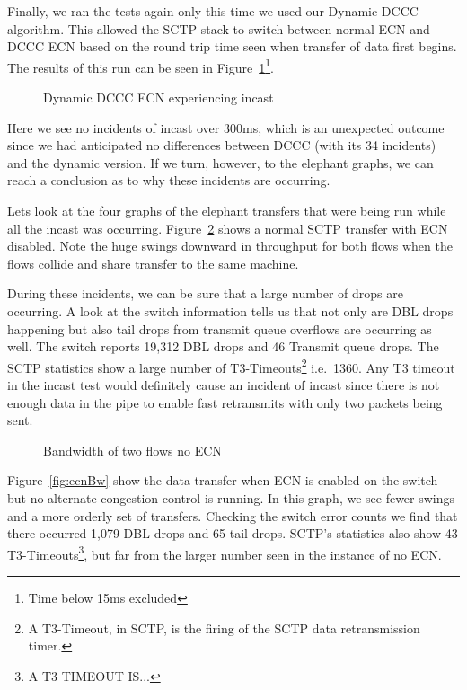 \documentclass[12pt]{article}
\begin{document}
\newpage

Finally, we ran the tests again only this time we used our Dynamic DCCC algorithm. This allowed the
SCTP stack to switch between normal ECN and DCCC ECN based on the round trip time
seen when transfer of data first begins. The results of this run can be seen in Figure~\ref{fig:dynIncast}\footnote{Time below 15ms excluded}.


\begin{figure}[h]
\centering
{}
\caption{Dynamic DCCC ECN experiencing incast}
\label{fig:dynIncast}
\end{figure}

Here we see no incidents of incast over 300ms, which is an unexpected
outcome since we had anticipated no differences between DCCC (with its 34 incidents) and
the dynamic version. If we turn, however, to the elephant graphs, we can reach a conclusion
as to why these incidents are occurring.

\newpage

Lets look at the four graphs of the elephant transfers that were being run while all
the incast was occurring. Figure~\ref{fig:noEcnBw} shows a normal SCTP transfer with
ECN disabled. Note the huge swings downward in throughput for both
flows when the flows collide and share transfer to the same machine. 

During these incidents, we can be sure that a large number of drops are occurring. A look at the switch
information tells us that not only are DBL drops happening but also tail
drops from transmit queue overflows are occurring as well.  The switch reports 19,312 DBL drops
and 46 Transmit queue drops. The SCTP statistics show
a large number of T3-Timeouts\footnote{A T3-Timeout, in SCTP, is the firing of the SCTP data retransmission timer.}
 i.e.~1360. Any T3 timeout in the incast test would definitely
cause an incident of incast since there is not enough data in the pipe to enable fast retransmits with
only two packets being sent.

\begin{figure}[h]
\centering
{}
\caption{Bandwidth of two flows no ECN}
\label{fig:noEcnBw}
\end{figure}


\newpage

Figure~\ref{fig:ecnBw} show the data transfer when ECN is enabled on
the switch but no alternate congestion control is running. In this graph,
we see fewer swings and a more orderly set of transfers. Checking
the switch error counts we find that there occurred 1,079 DBL drops and 65 tail
drops. SCTP's statistics also show 43 T3-Timeouts\footnote{A T3
  TIMEOUT IS...}, but far from the larger
number seen in the instance of no ECN.
\end{document}
